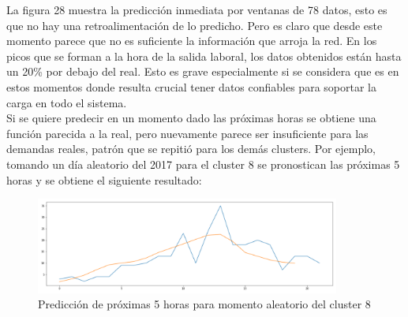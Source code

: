 \documentclass[12pt,spanish]{article}
\begin{document}
	La figura 28 muestra la predicción inmediata por ventanas de 78 datos, esto es que no hay una retroalimentación de lo predicho. Pero es claro que desde este momento parece que no es suficiente la información que arroja la red. En los picos que se forman a la hora de la salida laboral, los datos obtenidos están hasta un 20\% por debajo del real. Esto es grave especialmente si se considera que es en estos momentos donde resulta crucial tener datos confiables para soportar la carga en todo el sistema.\\
	Si se quiere predecir en un momento dado las próximas horas se obtiene una función parecida a la real, pero nuevamente parece ser insuficiente para las demandas reales, patrón que se repitió para los demás clusters. Por ejemplo, tomando un día aleatorio del 2017 para el cluster 8 se pronostican las próximas 5 horas y se obtiene el siguiente resultado:
	\begin{figure}[H]
		\centering
		\includegraphics[width=10cm]{Imagenes/m8_prediction.PNG}
		\begin{centering}
			\caption{Predicción de próximas 5 horas para momento aleatorio del cluster 8}
		\end{centering}
	\end{figure}
	\newpage
\end{document}
